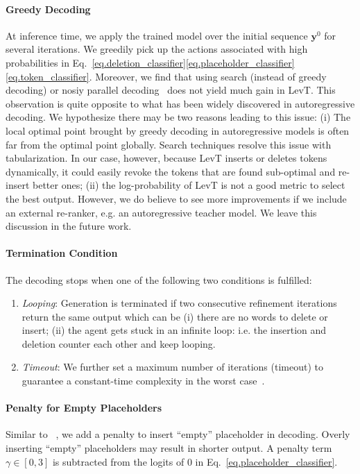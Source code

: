 \documentclass{article}
\begin{document}
\paragraph{Greedy Decoding} 
At inference time, we apply the trained model 
over the initial sequence $\bm{y}^0$ 
for several iterations. We greedily pick up the actions associated with high probabilities in  Eq.~\eqref{eq.deletion_classifier}\eqref{eq.placeholder_classifier}\eqref{eq.token_classifier}. 
Moreover, we find that using search (instead of greedy decoding) or nosiy parallel decoding~\citep{cho2016noisy} does not yield much gain in LevT. 
This observation is quite opposite to what has been widely discovered in autoregressive decoding.
We hypothesize there may be two reasons leading to this issue: (i) The local optimal point brought by greedy decoding in autoregressive models is often far from the optimal point globally. Search techniques resolve this issue with tabularization. In our case, however, because LevT inserts or deletes tokens dynamically, it could easily revoke the tokens that are found sub-optimal and re-insert better ones; (ii) the log-probability of LevT is not a good metric to select the best output. However, we do believe to see more improvements if we include an external re-ranker, e.g. an autoregressive teacher model. We leave this discussion in the future work.







\paragraph{Termination Condition}
The decoding stops when one of the following two conditions is fulfilled:
\begin{enumerate}[leftmargin=*]
\item \textit{Looping}:
    Generation is terminated if two consecutive refinement iterations return the same output which can be 
    (i) there are no words to delete or insert; 
    (ii) the agent gets stuck in an infinite loop: i.e.  the insertion and deletion counter each other and keep looping.


\item \textit{Timeout}: We further set a maximum number of iterations (timeout) to guarantee a constant-time complexity in the worst case~\citep{lee2018deterministic,levy2019constant}.
\end{enumerate}
\paragraph{Penalty for Empty Placeholders} 
Similar to ~\citet{stern2019insertion}, we add a penalty to insert ``empty'' placeholder in decoding. Overly inserting ``empty'' placeholders may result in shorter output. A penalty term $\gamma \in [0, 3]$ is subtracted from the logits of $0$ in Eq.~\eqref{eq.placeholder_classifier}.
\end{document}
